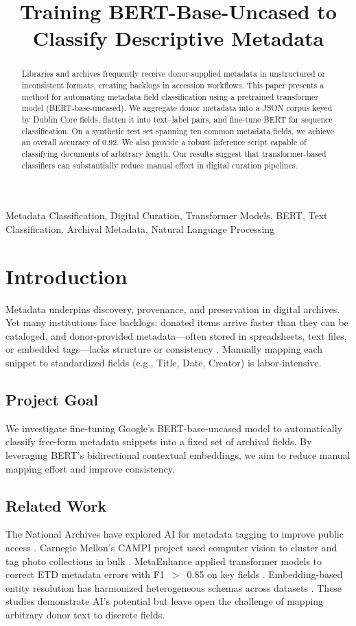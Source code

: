 \documentclass[conference]{IEEEtran}
\title{Training BERT-Base-Uncased to Classify Descriptive Metadata}
\author{
    \IEEEauthorblockN{Artem Saakov}
    \IEEEauthorblockA{
        University of Michigan\\
        School of Information\\
        United States\\
        asaakov@umich.edu
    }
}
\begin{document}
\maketitle

\begin{abstract}
Libraries and archives frequently receive donor-supplied metadata in unstructured or inconsistent formats, creating backlogs in accession workflows. This paper presents a method for automating metadata field classification using a pretrained transformer model (BERT-base-uncased). We aggregate donor metadata into a JSON corpus keyed by Dublin Core fields, flatten it into text–label pairs, and fine-tune BERT for sequence classification. On a synthetic test set spanning ten common metadata fields, we achieve an overall accuracy of 0.92. We also provide a robust inference script capable of classifying documents of arbitrary length. Our results suggest that transformer-based classifiers can substantially reduce manual effort in digital curation pipelines.
\end{abstract}

\begin{IEEEkeywords}
Metadata Classification, Digital Curation, Transformer Models, BERT, Text Classification, Archival Metadata, Natural Language Processing
\end{IEEEkeywords}

\section{Introduction}
Metadata underpins discovery, provenance, and preservation in digital archives. Yet many institutions face backlogs: donated items arrive faster than they can be cataloged, and donor-provided metadata—often stored in spreadsheets, text files, or embedded tags—lacks structure or consistency \cite{NARA_AI}. Manually mapping each snippet to standardized fields (e.g., Title, Date, Creator) is labor-intensive.

\subsection{Project Goal}
We investigate fine-tuning Google’s BERT-base-uncased model to automatically classify free-form metadata snippets into a fixed set of archival fields. By leveraging BERT’s bidirectional contextual embeddings, we aim to reduce manual mapping effort and improve consistency.

\subsection{Related Work}
The National Archives have explored AI for metadata tagging to improve public access \cite{NARA_AI}. Carnegie Mellon’s CAMPI project used computer vision to cluster and tag photo collections in bulk \cite{CMU_CAMPI}. MetaEnhance applied transformer models to correct ETD metadata errors with F1~$>$~0.85 on key fields \cite{MetaEnhance}. Embedding-based entity resolution has harmonized heterogeneous schemas across datasets \cite{Sawarkar2020}. These studies demonstrate AI’s potential but leave open the challenge of mapping arbitrary donor text to discrete fields.
\end{document}

